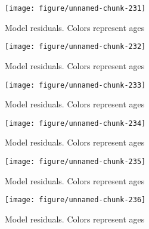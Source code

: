 \documentclass[a4paper]{article}\usepackage{graphicx, color}
\makeatletter
\def\maxwidth{ %
  \ifdim\Gin@nat@width>\linewidth
    \linewidth
  \else
    \Gin@nat@width
  \fi
}
\newenvironment{knitrout}{}{} %
\makeatother
\begin{document}
\begin{knitrout}
\color{fgcolor}\begin{figure}[H]


{\centering \texttt{[image: figure/unnamed-chunk-231]} 

}

\caption[Model residuals]{Model residuals. Colors represent ages\label{fig:unnamed-chunk-231}}
\end{figure}
\begin{figure}[H]


{\centering \texttt{[image: figure/unnamed-chunk-232]} 

}

\caption[Model residuals]{Model residuals. Colors represent ages\label{fig:unnamed-chunk-232}}
\end{figure}
\begin{figure}[H]


{\centering \texttt{[image: figure/unnamed-chunk-233]} 

}

\caption[Model residuals]{Model residuals. Colors represent ages\label{fig:unnamed-chunk-233}}
\end{figure}
\begin{figure}[H]


{\centering \texttt{[image: figure/unnamed-chunk-234]} 

}

\caption[Model residuals]{Model residuals. Colors represent ages\label{fig:unnamed-chunk-234}}
\end{figure}
\begin{figure}[H]


{\centering \texttt{[image: figure/unnamed-chunk-235]} 

}

\caption[Model residuals]{Model residuals. Colors represent ages\label{fig:unnamed-chunk-235}}
\end{figure}
\begin{figure}[H]


{\centering \texttt{[image: figure/unnamed-chunk-236]} 

}

\caption[Model residuals]{Model residuals. Colors represent ages\label{fig:unnamed-chunk-236}}
\end{figure}
\begin{figure}[H]



\end{figure}
\end{knitrout}
\end{document}

